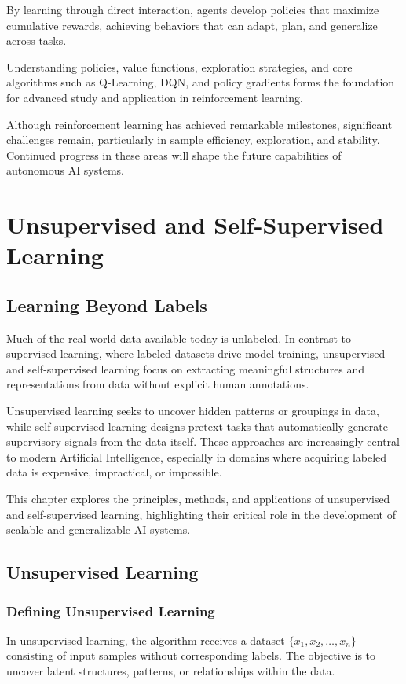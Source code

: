 \documentclass[openany]{book}
\begin{document}
By learning through direct interaction, agents develop policies that maximize 
cumulative rewards, achieving behaviors that can adapt, plan, and generalize 
across tasks.

Understanding policies, value functions, exploration strategies, and core 
algorithms such as Q-Learning, DQN, and policy gradients forms the foundation 
for advanced study and application in reinforcement learning.

Although reinforcement learning has achieved remarkable milestones, significant 
challenges remain, particularly in sample efficiency, exploration, and 
stability. Continued progress in these areas will shape the future capabilities 
of autonomous AI systems.

\chapter{Unsupervised and Self-Supervised Learning}

\section{Learning Beyond Labels}
Much of the real-world data available today is unlabeled. In contrast to 
supervised learning, where labeled datasets drive model training, unsupervised 
and self-supervised learning focus on extracting meaningful structures and 
representations from data without explicit human annotations.

Unsupervised learning seeks to uncover hidden patterns or groupings in data, 
while self-supervised learning designs pretext tasks that automatically generate 
supervisory signals from the data itself. These approaches are increasingly 
central to modern Artificial Intelligence, especially in domains where acquiring 
labeled data is expensive, impractical, or impossible.

This chapter explores the principles, methods, and applications of unsupervised 
and self-supervised learning, highlighting their critical role in the 
development of scalable and generalizable AI systems.

\section{Unsupervised Learning}

\subsection{Defining Unsupervised Learning}
In unsupervised learning, the algorithm receives a dataset \( \{ x_1, x_2, 
\dots, x_n \} \) consisting of input samples without corresponding labels. The 
objective is to uncover latent structures, patterns, or relationships within 
the data.
\end{document}
